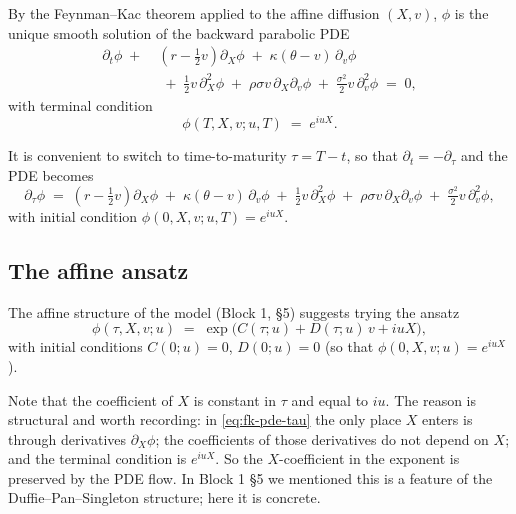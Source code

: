 \documentclass[11pt]{article}
\theoremstyle{plain}
\theoremstyle{definition}
\theoremstyle{remark}
\begin{document}
By the Feynman--Kac theorem applied to the affine diffusion \((X, v)\), \(\phi\) is the unique smooth solution of the backward parabolic PDE
\begin{equation}
    \begin{aligned}
        \partial_t \phi \;+\; & \left(r - \tfrac12 v\right) \partial_X \phi \;+\; \kappa(\theta - v)\, \partial_v \phi \\
        & \;+\; \tfrac12 v\, \partial^2_X \phi \;+\; \rho\sigma v\, \partial_X \partial_v \phi \;+\; \tfrac{\sigma^2}{2} v\, \partial^2_v \phi \;=\; 0,
    \end{aligned}                                                                                \label{eq:fk-pde}
\end{equation}
with terminal condition
\[
    \phi(T, X, v; u, T) \;=\; e^{i u X}.
\]

It is convenient to switch to time-to-maturity \(\tau = T - t\), so that \(\partial_t = -\partial_\tau\) and the PDE becomes
\begin{equation}
    \partial_\tau \phi \;=\; \left(r - \tfrac12 v\right) \partial_X \phi \;+\; \kappa(\theta - v)\, \partial_v \phi \;+\; \tfrac12 v\, \partial^2_X \phi \;+\; \rho\sigma v\, \partial_X \partial_v \phi \;+\; \tfrac{\sigma^2}{2} v\, \partial^2_v \phi,                                       \label{eq:fk-pde-tau}
\end{equation}
with initial condition \(\phi(0, X, v; u, T) = e^{i u X}\).

\subsection{The affine ansatz}

The affine structure of the model (Block 1, \S5) suggests trying the ansatz
\begin{equation}
    \phi(\tau, X, v; u) \;=\; \exp\!\bigl(C(\tau; u) + D(\tau; u)\, v + i u X\bigr),                  \label{eq:ansatz}
\end{equation}
with initial conditions \(C(0; u) = 0\), \(D(0; u) = 0\) (so that \(\phi(0, X, v; u) = e^{i u X}\)).

Note that the coefficient of \(X\) is constant in \(\tau\) and equal to \(i u\). The reason is structural and worth recording: in \eqref{eq:fk-pde-tau} the only place \(X\) enters is through derivatives \(\partial_X \phi\); the coefficients of those derivatives do not depend on \(X\); and the terminal condition is \(e^{iuX}\). So the \(X\)-coefficient in the exponent is preserved by the PDE flow. In Block 1 \S5 we mentioned this is a feature of the Duffie--Pan--Singleton structure; here it is concrete.
\end{document}
